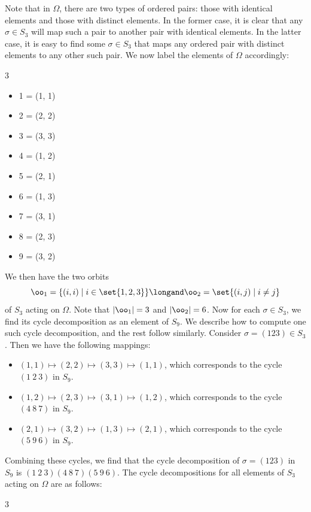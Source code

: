 \begin{sol}
	Note that in $\Omega$, there are two types of ordered pairs: those with identical elements and those with distinct elements. In the former case, it is clear that any $\sigma \in S_3$ will map such a pair to another pair with identical elements. In the latter case, it is easy to find some $\sigma \in S_3$ that maps any ordered pair with distinct elements to any other such pair. We now label the elements of $\Omega$ accordingly:
	\begin{multicols}{3}
		\begin{itemize}
			\item 1 = (1, 1)
			\item 2 = (2, 2)
			\item 3 = (3, 3)
			\item 4 = (1, 2)
			\item 5 = (2, 1)
			\item 6 = (1, 3)
			\item 7 = (3, 1)
			\item 8 = (2, 3)
			\item 9 = (3, 2)
		\end{itemize}
	\end{multicols}
	We then have the two orbits 
	\[\oo_1 = \{(i, i) \mid i \in \set{1, 2, 3}\} \longand \oo_2 = \set{(i, j) \mid i \neq j}\]
	of $S_3$ acting on $\Omega$. Note that $|\oo_1| = 3$ and $|\oo_2| = 6$. Now for each $\sigma \in S_3$, we find its cycle decomposition as an element of $S_9$. We describe how to compute one such cycle decomposition, and the rest follow similarly. Consider $\sigma = (1 2 3) \in S_3$. Then we have the following mappings:
	\begin{itemize}
		\item $(1, 1) \mapsto (2, 2) \mapsto (3, 3) \mapsto (1, 1)$, which corresponds to the cycle $(1\ 2\ 3)$ in $S_9$.
		\item $(1, 2) \mapsto (2, 3) \mapsto (3, 1) \mapsto (1, 2)$, which corresponds to the cycle $(4\ 8\ 7)$ in $S_9$.
		\item $(2, 1) \mapsto (3, 2) \mapsto (1, 3) \mapsto (2, 1)$, which corresponds to the cycle $(5\ 9\ 6)$ in $S_9$.
	\end{itemize}
	Combining these cycles, we find that the cycle decomposition of $\sigma = (1 2 3)$ in $S_9$ is $(1\ 2\ 3)(4\ 8\ 7)(5\ 9\ 6)$. The cycle decompositions for all elements of $S_3$ acting on $\Omega$ are as follows:
	\begin{multicols}{3}
		\begin{itemize}

\end{itemize}
\end{multicols}
\end{sol}
